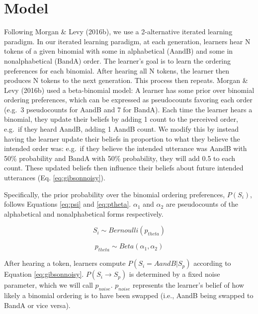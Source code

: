 \documentclass[10pt, letterpaper, hidelinks]{article}
\begin{document}
\hypertarget{model}{%
\section{Model}\label{model}}

Following Morgan \& Levy (2016b), we use a 2-alternative iterated
learning paradigm. In our iterated learning paradigm, at each
generation, learners hear N tokens of a given binomial with some in
alphabetical (AandB) and some in nonalphabetical (BandA) order. The
learner's goal is to learn the ordering preferences for each binomial.
After hearing all N tokens, the learner then produces N tokens to the
next generation. This process then repeats. Morgan \& Levy (2016b) used
a beta-binomial model: A learner has some prior over binomial ordering
preferences, which can be expressed as pseudocounts favoring each order
(e.g.~3 pseudocounts for AandB and 7 for BandA). Each time the learner
hears a binomial, they update their beliefs by adding 1 count to the
perceived order, e.g.~if they heard AandB, adding 1 AandB count. We
modify this by instead having the learner update their beliefs in
proportion to what they believe the intended order was: e.g.~if they
believe the intended utterance was AandB with 50\% probability and BandA
with 50\% probability, they will add 0.5 to each count. These updated
beliefs then influence their beliefs about future intended utterances
(Eq. \ref{eq:gibsonnoisy}).

Specifically, the prior probability over the binomial ordering
preferences, \(P(S_i)\), follows Equations \ref{eq:psi} and
\ref{eq:ptheta}. \(\alpha_1\) and \(\alpha_2\) are pseudocounts of the
alphabetical and nonalphabetical forms respectively.

\begin{equation}
\label{eq:psi}
S_i \sim Bernoulli(p_{theta})
\end{equation}

\begin{equation}
\label{eq:ptheta}
p_{theta} \sim Beta(\alpha_1, \alpha_2)
\end{equation}

After hearing a token, learners compute \(P(S_i = AandB|S_p)\) according
to Equation \ref{eq:gibsonnoisy}. \(P(S_i \to S_p)\) is determined by a
fixed noise parameter, which we will call \(p_{noise}\). \(p_{noise}\)
represents the learner's belief of how likely a binomial ordering is to
have been swapped (i.e., AandB being swapped to BandA or vice versa).
\end{document}
